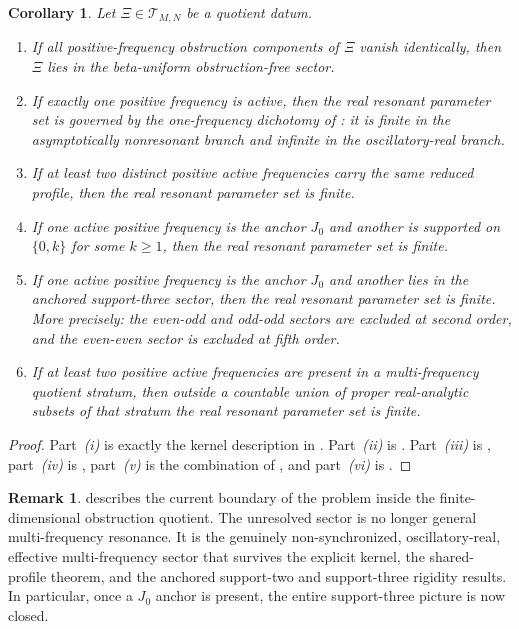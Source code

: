\documentclass[11pt,reqno]{amsart}
\newtheorem{corollary}[theorem]{Corollary}
\theoremstyle{definition}
\newtheorem{remark}[theorem]{Remark}
\begin{document}
\begin{corollary}\label{cor:geometry-landscape}
Let $\Xi\in\mathcal T_{M,N}$ be a quotient datum.
\begin{enumerate}[label=\emph{(\roman*)}]
\item If all positive-frequency obstruction components of $\Xi$ vanish identically, then $\Xi$
lies in the beta-uniform obstruction-free sector.
\item If exactly one positive frequency is active, then the real resonant parameter set is
governed by the one-frequency dichotomy of : it is finite in
the asymptotically nonresonant branch and infinite in the oscillatory-real branch.
\item If at least two distinct positive active frequencies carry the same reduced profile, then
the real resonant parameter set is finite.
\item If one active positive frequency is the anchor $J_0$ and another is supported on
$\{0,k\}$ for some $k\ge 1$, then the real resonant parameter set is finite.
\item If one active positive frequency is the anchor $J_0$ and another lies in the anchored
support-three sector, then the real resonant parameter set is finite. More precisely:
the even-odd and odd-odd sectors are excluded at second order, and the even-even sector is
excluded at fifth order.
\item If at least two positive active frequencies are present in a multi-frequency quotient
stratum, then outside a countable union of proper real-analytic subsets of that stratum the real
resonant parameter set is finite.
\end{enumerate}
\end{corollary}

\begin{proof}
Part~\emph{(i)} is exactly the kernel description in .
Part~\emph{(ii)} is . Part~\emph{(iii)} is
, part~\emph{(iv)} is ,
part~\emph{(v)} is the combination of
,
and part~\emph{(vi)} is .
\end{proof}

\begin{remark}
 describes the current boundary of the problem inside the
finite-dimensional obstruction quotient. The unresolved sector is no longer general
multi-frequency resonance. It is the genuinely non-synchronized, oscillatory-real, effective
multi-frequency sector that survives the explicit kernel, the shared-profile theorem, and the
anchored support-two and support-three rigidity results. In particular, once a $J_0$ anchor is
present, the entire support-three picture is now closed.
\end{remark}
\end{document}
